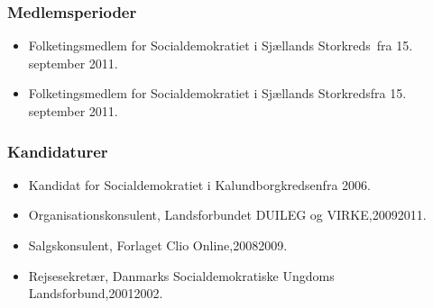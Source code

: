 \documentclass[11pt, a4paper]{awesome-cv}
\begin{document}
\begin{cvletter}
\subsubsection*{Medlemsperioder}
\begin{itemize}
\item Folketingsmedlem for Socialdemokratiet i Sjællands Storkreds fra 15. september 2011.
\item Folketingsmedlem for Socialdemokratiet i Sjællands Storkredsfra 15. september 2011.
\end{itemize}
\subsubsection*{Kandidaturer}
\begin{itemize}
\item Kandidat for Socialdemokratiet i Kalundborgkredsenfra 2006.
\end{itemize}
\begin{itemize}
\item Organisationskonsulent, Landsforbundet DUILEG og VIRKE,20092011.
\item Salgskonsulent, Forlaget Clio Online,20082009.
\item Rejsesekretær, Danmarks Socialdemokratiske Ungdoms Landsforbund,20012002.
\end{itemize}
\end{cvletter}
\end{document}
